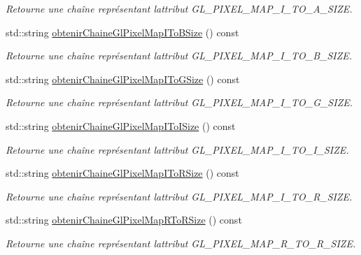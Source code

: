 \begin{DoxyCompactItemize}
\begin{DoxyCompactList}\small\item\em Retourne une chaîne représentant l\textquotesingle{}attribut G\+L\+\_\+\+P\+I\+X\+E\+L\+\_\+\+M\+A\+P\+\_\+\+I\+\_\+\+T\+O\+\_\+\+A\+\_\+\+S\+I\+Z\+E. \end{DoxyCompactList}\item 
std\+::string \hyperlink{group__utilitaire_ga8fac55d9d77a0b119c7247536471b5fe}{obtenir\+Chaine\+Gl\+Pixel\+Map\+I\+To\+B\+Size} () const 
\begin{DoxyCompactList}\small\item\em Retourne une chaîne représentant l\textquotesingle{}attribut G\+L\+\_\+\+P\+I\+X\+E\+L\+\_\+\+M\+A\+P\+\_\+\+I\+\_\+\+T\+O\+\_\+\+B\+\_\+\+S\+I\+Z\+E. \end{DoxyCompactList}\item 
std\+::string \hyperlink{group__utilitaire_gaa449af86fad19dad37eea16a918b3c33}{obtenir\+Chaine\+Gl\+Pixel\+Map\+I\+To\+G\+Size} () const 
\begin{DoxyCompactList}\small\item\em Retourne une chaîne représentant l\textquotesingle{}attribut G\+L\+\_\+\+P\+I\+X\+E\+L\+\_\+\+M\+A\+P\+\_\+\+I\+\_\+\+T\+O\+\_\+\+G\+\_\+\+S\+I\+Z\+E. \end{DoxyCompactList}\item 
std\+::string \hyperlink{group__utilitaire_ga0eb7b39aef0ca240d98e9507703cd1e4}{obtenir\+Chaine\+Gl\+Pixel\+Map\+I\+To\+I\+Size} () const 
\begin{DoxyCompactList}\small\item\em Retourne une chaîne représentant l\textquotesingle{}attribut G\+L\+\_\+\+P\+I\+X\+E\+L\+\_\+\+M\+A\+P\+\_\+\+I\+\_\+\+T\+O\+\_\+\+I\+\_\+\+S\+I\+Z\+E. \end{DoxyCompactList}\item 
std\+::string \hyperlink{group__utilitaire_gad3cc6e9acee4df62ca1407e6b42d87d4}{obtenir\+Chaine\+Gl\+Pixel\+Map\+I\+To\+R\+Size} () const 
\begin{DoxyCompactList}\small\item\em Retourne une chaîne représentant l\textquotesingle{}attribut G\+L\+\_\+\+P\+I\+X\+E\+L\+\_\+\+M\+A\+P\+\_\+\+I\+\_\+\+T\+O\+\_\+\+R\+\_\+\+S\+I\+Z\+E. \end{DoxyCompactList}\item 
std\+::string \hyperlink{group__utilitaire_ga315fd9fa34e26c259ce76e33ddadc11b}{obtenir\+Chaine\+Gl\+Pixel\+Map\+R\+To\+R\+Size} () const 
\begin{DoxyCompactList}\small\item\em Retourne une chaîne représentant l\textquotesingle{}attribut G\+L\+\_\+\+P\+I\+X\+E\+L\+\_\+\+M\+A\+P\+\_\+\+R\+\_\+\+T\+O\+\_\+\+R\+\_\+\+S\+I\+Z\+E. \end{DoxyCompactList}\item 

\end{DoxyCompactItemize}
